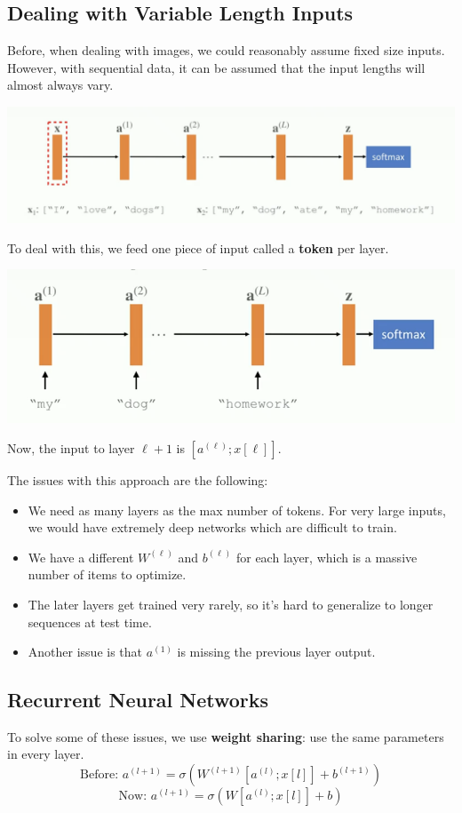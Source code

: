 \documentclass[11pt]{scrartcl}
\begin{document}
\subsection{Dealing with Variable Length Inputs}
Before, when dealing with images, we could reasonably assume fixed size inputs.  However, with sequential data, it can be assumed that the input lengths will almost always vary. 
\begin{center}
\includegraphics[scale=0.5]{images/var_length.png}
\end{center}

To deal with this, we feed one piece of input called a \textbf{token} per layer. 
\begin{center}
\includegraphics[scale=0.5]{images/token.png}
\end{center}
Now, the input to layer $\ell + 1$ is $[a^{(\ell)}; x[\ell] ]$.

The issues with this approach are the following:
\begin{itemize}
\item We need as many layers as the max number of tokens.  For very large inputs, we would have extremely deep networks which are difficult to train.
\item We have a different $W^{(\ell)}$ and $b^{(\ell)}$ for each layer, which is a massive number of items to optimize.  
\item The later layers get trained very rarely, so it's hard to generalize to longer sequences at test time.  
\item Another issue is that $a^{(1)}$ is missing the previous layer output. 
\end{itemize}
\subsection{Recurrent Neural Networks}
To solve some of these issues, we use \textbf{weight sharing}: use the same parameters in every layer.
$$\text{Before: } a^{(l + 1)} = \sigma(W^{(l + 1)}[a^{(l)}; x[l]] + b^{(l + 1)})$$
$$\text{Now: } a^{(l + 1)} = \sigma(W[a^{(l)}; x[l]] + b)$$
\end{document}
